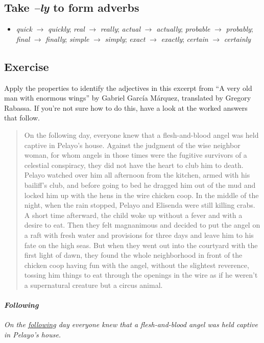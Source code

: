\subsection*{Take \textit{--ly} to form adverbs}
\begin{itemize}[noitemsep]
    \item \textit{quick} $\rightarrow$ \textit{quickly}; \textit{real} $\rightarrow$ \textit{really}; \textit{actual} $\rightarrow$ \textit{actually}; \textit{probable} $\rightarrow$ \textit{probably}; \textit{final} $\rightarrow$ \textit{finally}; \textit{simple} $\rightarrow$ \textit{simply}; \textit{exact} $\rightarrow$ \textit{exactly}; \textit{certain} $\rightarrow$ \textit{certainly}
\end{itemize}

\subsection*{Exercise}
Apply the properties to identify the adjectives in this excerpt from ``A very old man with enormous wings'' by Gabriel García Márquez, translated by Gregory Rabassa. If you're not sure how to do this, have a look at the worked answers that follow.
\begin{quote}
On the following day, everyone knew that a flesh-and-blood angel was held captive in Pelayo's house. Against the judgment of the wise neighbor woman, for whom angels in those times were the fugitive survivors of a celestial conspiracy, they did not have the heart to club him to death. Pelayo watched over him all afternoon from the kitchen, armed with his bailiff's club, and before going to bed he dragged him out of the mud and locked him up with the hens in the wire chicken coop. In the middle of the night, when the rain stopped, Pelayo and Elisenda were still killing crabs. A short time afterward, the child woke up without a fever and with a desire to eat. Then they felt magnanimous and decided to put the angel on a raft with fresh water and provisions for three days and leave him to his fate on the high seas. But when they went out into the courtyard with the first light of dawn, they found the whole neighborhood in front of the chicken coop having fun with the angel, without the slightest reverence, tossing him things to eat through the openings in the wire as if he weren't a supernatural creature but a circus animal.
\end{quote}

\paragraph*{\textit{Following}}
\textit{On the \uline{following} day everyone knew that a flesh-and-blood angel was held captive in Pelayo's house.}

